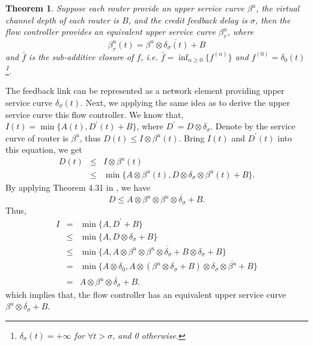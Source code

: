 \documentclass[10pt,journal]{IEEEtran}
\newtheorem{theorem}{Theorem}
\begin{document}
\begin{theorem}\label{credit}
Suppose each router provide an upper service curve $\beta^u$, the virtual channel depth of each router is $B$, and the credit feedback delay is $\sigma$, then the flow controller provides an equivalent upper service curve $\beta^{u}_\tau$, where $$\beta^{u}_\tau(t)=\overline{\beta^u\otimes\delta_\sigma(t)+B}$$
and $\bar{f}$ is the sub-additive closure of $f$, i.e. $\bar{f}=\inf_{n\geq 0}\{f^{(n)}\}$ and $f^{(0)}=\delta_0(t)$\footnote{$\delta_\sigma(t)=+\infty$ for $\forall t>\sigma$, and 0 otherwise.}.
\end{theorem}
\begin{IEEEproof}
The feedback link can be represented as a network element providing upper service curve $\delta_\sigma(t)$. Next, we applying the same idea as \cite{qian2009analysis} to derive the upper service curve this flow controller. We know that, $I(t)=\min\{A(t),D^\prime(t)+B\}$, where $D^\prime=D\otimes\delta_\sigma$. Denote by the service curve of router is $\beta^u$, thus $D(t)\leq I\otimes \beta^u(t)$. Bring $I(t)$ and $D^\prime(t)$ into this equation, we get
\begin{eqnarray*}
D(t)&\leq& I\otimes \beta^u(t)\\
&\leq& \min\{A\otimes \beta^u(t),D\otimes\delta_\sigma\otimes \beta^u(t)+B\}.
\end{eqnarray*}
By applying Theorem 4.31 in \cite{Boudec2001Network}, we have
$$D\leq A\otimes \beta^u\otimes\overline{\beta^u\otimes\delta_\sigma+B}.$$
Thus,
\begin{eqnarray*}
  I&=& \min\{A,D^\prime+B\}\\
  &\leq& \min\{A,D\otimes\delta_\sigma+B\}\\
  &\leq& \min\{A,A\otimes \beta^u\otimes\overline{\beta^u\otimes\delta_\sigma+B}\otimes\delta_\sigma+B\}\\
  &=& \min\{A\otimes \delta_0,A\otimes (\beta^u\otimes\delta_\sigma+B)\otimes\overline{\delta_\sigma\otimes\beta^u+B}\}\\
  &=& A\otimes\overline{\beta^u\otimes\delta_\sigma+B}.
\end{eqnarray*}
which implies that, the flow controller has an equivalent upper service curve $\overline{\beta^u\otimes\delta_\sigma+B}$.
\end{IEEEproof}
\end{document}
